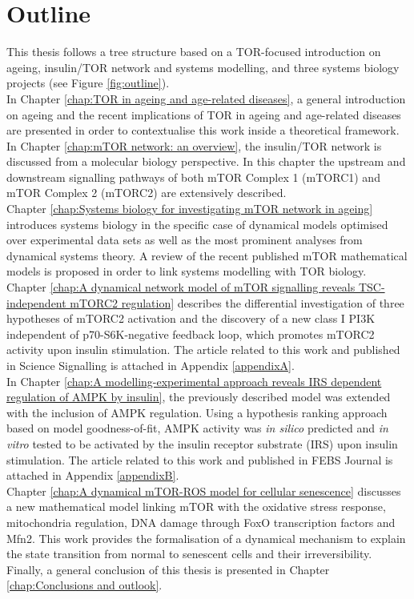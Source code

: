 \section{Outline}
\label{sec:Outline}
This thesis follows a tree structure based on a TOR-focused introduction on ageing, insulin/TOR network and systems modelling, and three systems biology projects (see Figure \ref{fig:outline}).\\
In Chapter \ref{chap:TOR in ageing and age-related diseases}, a general introduction on ageing and the recent implications of TOR in ageing and age-related diseases are presented in order to contextualise this work inside a theoretical framework. \\
In Chapter \ref{chap:mTOR network: an overview}, the insulin/TOR network is discussed from a molecular biology perspective. In this chapter the upstream and downstream signalling pathways of both mTOR Complex 1 (mTORC1) and mTOR Complex 2 (mTORC2) are extensively described.\\
Chapter \ref{chap:Systems biology for investigating mTOR network in ageing} introduces systems biology in the specific case of dynamical models optimised over experimental data sets as well as the most prominent analyses from dynamical systems theory. A review of the recent published mTOR mathematical models is proposed in order to link systems modelling with TOR biology.\\
Chapter \ref{chap:A dynamical network model of mTOR signalling reveals TSC-independent mTORC2 regulation} describes the differential investigation of three hypotheses of mTORC2 activation and the discovery of a new class I PI3K independent of p70-S6K-negative feedback loop, which promotes mTORC2 activity upon insulin stimulation. The article related to this work and published in Science Signalling is attached in Appendix \ref{appendixA}. \\
In Chapter \ref{chap:A modelling-experimental approach reveals IRS dependent regulation of AMPK by insulin}, the previously described model was extended with the inclusion of AMPK regulation. Using a hypothesis ranking approach based on model goodness-of-fit, AMPK activity was \emph{in silico} predicted and \emph{in vitro} tested to be activated by the insulin receptor substrate (IRS) upon insulin stimulation. The article related to this work and published in FEBS Journal is attached in Appendix \ref{appendixB}. \\
Chapter \ref{chap:A dynamical mTOR-ROS model for cellular senescence} discusses a new mathematical model linking mTOR with the oxidative stress response, mitochondria regulation, DNA damage through FoxO transcription factors and Mfn2. This work provides the formalisation of a dynamical mechanism to explain the state transition from normal to senescent cells and their irreversibility.\\
Finally, a general conclusion of this thesis is presented in Chapter \ref{chap:Conclusions and outlook}.


